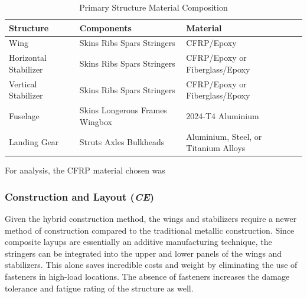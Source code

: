 \begin{table}[!h]
\centering
\caption{Primary Structure Material Composition}
\begin{tabular}{|p{3.5cm}||p{2cm}|p{6cm}|}\toprule
\textbf{Structure} & \textbf{Components} & \textbf{Material} \\ \hline \hline 

    Wing & Skins \newline Ribs \newline Spars \newline Stringers & CFRP/Epoxy \\ \hline
    Horizontal Stabilizer & Skins \newline Ribs \newline Spars \newline Stringers & CFRP/Epoxy or Fiberglass/Epoxy \\\hline
    Vertical Stabilizer & Skins \newline Ribs \newline Spars \newline Stringers & CFRP/Epoxy or Fiberglass/Epoxy \\\hline
    Fuselage & Skins \newline Longerons \newline Frames \newline Wingbox & 2024-T4 Aluminium \\\hline
    Landing Gear & Struts \newline Axles \newline Bulkheads & Aluminium, Steel, or Titanium Alloys \\ \bottomrule

\end{tabular}
\label{tab:material_selection}
\end{table}

For analysis, the CFRP material chosen was 

\subsubsection{Construction and Layout (\textit{CE})}
Given the hybrid construction method, the wings and stabilizers require a newer method of construction compared to the traditional metallic construction. Since composite layups are essentially an additive manufacturing technique, the stringers can be integrated into the upper and lower panels of the wings and stabilizers. This alone saves incredible costs and weight by eliminating the use of fasteners in high-load locations. The absence of fasteners increases the damage tolerance and fatigue rating of the structure as well.

